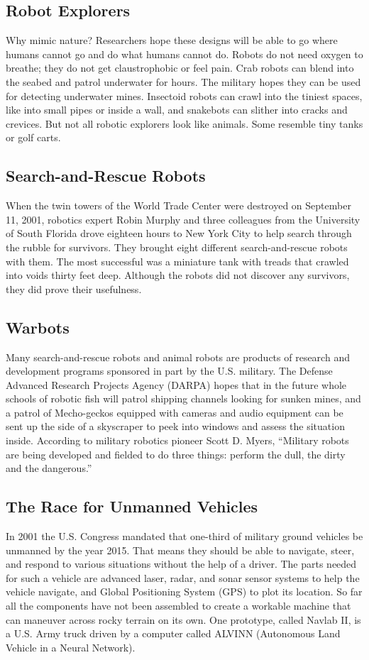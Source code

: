 \documentclass[12pt]{article}
\begin{document}
\subsection{Robot Explorers} 
\large
Why mimic nature? Researchers hope these designs will be able to go where humans cannot go and do what humans cannot do. Robots do not need oxygen to breathe; they do not get claustrophobic or feel pain. Crab robots can blend into the seabed and patrol underwater for hours. The military hopes they can be used for detecting underwater mines. Insectoid robots can crawl into the tiniest spaces, like into small pipes or inside a wall, and snakebots can slither into cracks and crevices. But not all robotic explorers look like animals. Some resemble tiny tanks or golf carts.\\
\huge
\subsection{Search-and-Rescue Robots}
\large
When the twin towers of the World Trade Center were destroyed on September 11, 2001, robotics expert Robin Murphy and three colleagues from the University of South Florida drove eighteen hours to New York City to help search through the rubble for survivors. They brought eight different search-and-rescue robots with them. The most successful was a miniature tank with treads that crawled into voids thirty feet deep. Although the robots did not discover any survivors, they did prove their usefulness. \\
 \huge
 \subsection{Warbots}
 \large
  Many search-and-rescue robots and animal robots are products of research and development programs sponsored in part by the U.S. military. The Defense Advanced Research Projects Agency (DARPA) hopes that in the future whole schools of robotic fish will patrol shipping channels looking for sunken mines, and a patrol of Mecho-geckos equipped with cameras and audio equipment can be sent up the side of a skyscraper to peek into windows and assess the situation inside. According to military robotics pioneer Scott D. Myers, “Military robots are being developed and fielded to do three things: perform the dull, the dirty and the dangerous.”\\
 \huge
\subsection{The Race for Unmanned Vehicles}
\large
   In 2001 the U.S. Congress mandated that one-third of military ground vehicles be unmanned by the year 2015. That means they should be able to navigate, steer, and respond to various situations without the help of a driver. The parts needed for such a vehicle are advanced laser, radar, and sonar sensor systems to help the vehicle navigate, and Global Positioning System (GPS) to plot its location. So far all the components have not been assembled to create a workable machine that can maneuver across rocky terrain on its own. One prototype, called Navlab II, is a U.S. Army truck driven by a computer called ALVINN (Autonomous Land Vehicle in a Neural Network).
\newpage
\Huge
\end{document}
